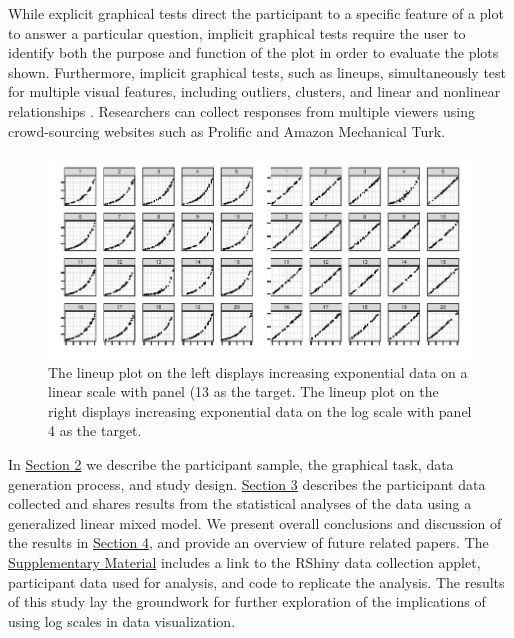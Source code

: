 \documentclass[12pt]{article}
\begin{document}
While explicit graphical tests direct the participant to a specific
feature of a plot to answer a particular question, implicit graphical
tests require the user to identify both the purpose and function of the
plot in order to evaluate the plots shown. Furthermore, implicit
graphical tests, such as lineups, simultaneously test for multiple
visual features, including outliers, clusters, and linear and nonlinear
relationships \citep{vanderplas2015spatial}. Researchers can collect
responses from multiple viewers using crowd-sourcing websites such as
Prolific and Amazon Mechanical Turk.

\begin{figure}[tbp]

{\centering \includegraphics[width=\linewidth,]{logarithmic-lineups-revisions_files/figure-latex/lineup-example-1} 

}

\caption[Lineup examples]{The lineup plot on the left displays increasing exponential data on a linear scale with panel (13 as the target. The lineup plot on the right displays increasing exponential data on the log scale with panel 4 as the target.}\label{fig:lineup-example}
\end{figure}

In \protect\hyperlink{methods}{Section 2} we describe the participant
sample, the graphical task, data generation process, and study design.
\protect\hyperlink{results}{Section 3} describes the participant data
collected and shares results from the statistical analyses of the data
using a generalized linear mixed model. We present overall conclusions
and discussion of the results in
\protect\hyperlink{conclusion-discussion}{Section 4}, and provide an
overview of future related papers. The
\protect\hyperlink{supplementary-material}{Supplementary Material}
includes a link to the RShiny data collection applet, participant data
used for analysis, and code to replicate the analysis. The results of
this study lay the groundwork for further exploration of the
implications of using log scales in data visualization.
\end{document}

